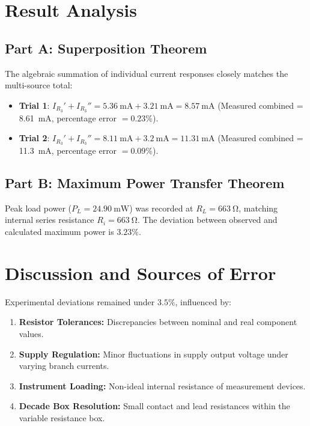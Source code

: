 \section{Result Analysis}

\subsection{Part A: Superposition Theorem}
The algebraic summation of individual current responses closely matches the multi-source total:
\begin{itemize}
	\item \textbf{Trial 1}: $I_{R_3}' + I_{R_3}'' = \qty{5.36}{\milli\ampere} + \qty{3.21}{\milli\ampere} = \qty{8.57}{\milli\ampere}$ (Measured combined = \qty{8.61}{\milli\ampere}, percentage error $= 0.23\%$).
	\item \textbf{Trial 2}: $I_{R_3}' + I_{R_3}'' = \qty{8.11}{\milli\ampere} + \qty{3.2}{\milli\ampere} = \qty{11.31}{\milli\ampere}$ (Measured combined = \qty{11.3}{\milli\ampere}, percentage error $= 0.09\%$).
\end{itemize}

\subsection{Part B: Maximum Power Transfer Theorem}
Peak load power ($P_L=\qty{24.90}{\milli\watt}$) was recorded at $R_L=\qty{663}{\ohm}$, matching internal series resistance $R_i=\qty{663}{\ohm}$. The deviation between observed and calculated maximum power is $3.23\%$.

\section{Discussion and Sources of Error}
Experimental deviations remained under $3.5\%$, influenced by:
\begin{enumerate}
	\item \textbf{Resistor Tolerances:} Discrepancies between nominal and real component values.
	\item \textbf{Supply Regulation:} Minor fluctuations in supply output voltage under varying branch currents.
	\item \textbf{Instrument Loading:} Non-ideal internal resistance of measurement devices.
	\item \textbf{Decade Box Resolution:} Small contact and lead resistances within the variable resistance box.
\end{enumerate}

